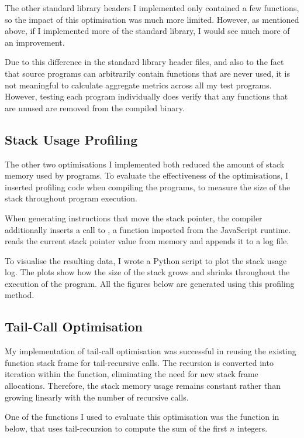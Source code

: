 \documentclass[00-main.tex]{subfiles}
\begin{document}
The other standard library headers I implemented only contained a few functions, so the impact of this optimisation was much more limited. However, as mentioned above, if I implemented more of the standard library, I would see much more of an improvement.

Due to this difference in the standard library header files, and also to the fact that source programs can arbitrarily contain functions that are never used, it is not meaningful to calculate aggregate metrics across all my test programs.
However, testing each program individually does verify that any functions that are unused are removed from the compiled binary.

\subsection{Stack Usage Profiling}

The other two optimisations I implemented both reduced the amount of stack memory used by programs.
To evaluate the effectiveness of the optimisations, I inserted profiling code when compiling the programs, to measure the size of the stack throughout program execution.

When generating instructions that move the stack pointer, the compiler additionally inserts a call to , a function imported from the JavaScript runtime.
 reads the current stack pointer value from memory and appends it to a log file.

To visualise the resulting data, I wrote a Python script to plot the stack usage log.
The plots show how the size of the stack grows and shrinks throughout the execution of the program.
All the figures below are generated using this profiling method.




\subsection{Tail-Call Optimisation}

My implementation of tail-call optimisation was successful in reusing the existing function stack frame for tail-recursive calls. The recursion is converted into iteration within the function, eliminating the need for new stack frame allocations.
Therefore, the stack memory usage remains constant rather than growing linearly with the number of recursive calls.

One of the functions I used to evaluate this optimisation was the function in  below, that uses tail-recursion to compute the sum of the first $n$ integers.
\end{document}
